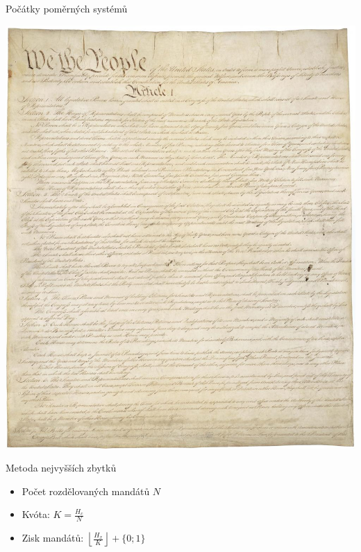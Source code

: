 \documentclass[17pt]{beamer}
\begin{document}
\begin{frame}{Počátky poměrných systémů}
\begin{center}
\includegraphics[scale=0.2]{zdroje/const.jpg}
\end{center}
\end{frame}


\begin{frame}{Metoda nejvyšších zbytků}
\begin{itemize}
\item Počet rozdělovaných mandátů $N$
\item Kvóta: $K=\frac{H_{c}}{N}$
\item Zisk mandátů: $\left\lfloor\frac{H_{x}}{K}\right\rfloor+\{0;1\}$
\end{itemize}
\end{frame}
\end{document}
